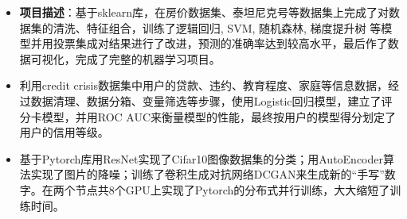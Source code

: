 \documentclass{resume}
\begin{document}
\begin{itemize}

\item {}
\textbf{项目描述}：基于sklearn库，在房价数据集、泰坦尼克号等数据集上完成了对数据集的清洗、特征组合，训练了逻辑回归, SVM, 随机森林, 梯度提升树 等模型并用投票集成对结果进行了改进，预测的准确率达到较高水平，最后作了数据可视化，完成了完整的机器学习项目。

\item {}
利用credit crisis数据集中用户的贷款、违约、教育程度、家庭等信息数据，经过数据清理、数据分箱、变量筛选等步骤，使用Logistic回归模型，建立了评分卡模型，并用ROC AUC来衡量模型的性能，最终按用户的模型得分划定了用户的信用等级。

\item {}
基于Pytorch库用ResNet实现了Cifar10图像数据集的分类；用AutoEncoder算法实现了图片的降噪；训练了卷积生成对抗网络DCGAN来生成新的“手写”数字。在两个节点共8个GPU上实现了Pytorch的分布式并行训练，大大缩短了训练时间。



\end{itemize}
\end{document}
